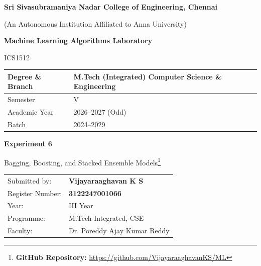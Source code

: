 \documentclass[11pt,a4paper]{article}
\title{}
\date{}
\begin{document}
\begin{titlepage}
\centering
\vspace*{1cm}
{\Large\bfseries Sri Sivasubramaniya Nadar College of Engineering, Chennai\par}
\vspace{0.2cm}
{\normalsize (An Autonomous Institution Affiliated to Anna University)\par}
\vspace{1.2cm}

{\Large\bfseries Machine Learning Algorithms Laboratory\par}
\vspace{0.3cm}
{\large ICS1512\par}
\vspace{1.5cm}

\begin{tabular}{|p{5.5cm}|p{7cm}|}
\hline
Degree \& Branch & M.Tech (Integrated) Computer Science \& Engineering \\
\hline
Semester & V \\
\hline
Academic Year & 2026--2027 (Odd) \\
\hline
Batch & 2024--2029 \\
\hline
\end{tabular}

\vspace{1.8cm}
{\Large\bfseries Experiment 6\par}
\vspace{0.3cm}
{\large Bagging, Boosting, and Stacked Ensemble Models\footnote{\textbf{GitHub Repository: }\url{https://github.com/VijayaraaghavanKS/ML}}\par}
\vspace{2.5cm}

\begin{tabular}{ll}
Submitted by: & \textbf{Vijayaraaghavan K S} \\[4pt]
Register Number: & \textbf{3122247001066} \\[4pt]
Year: & III Year \\[4pt]
Programme: & M.Tech Integrated, CSE \\[4pt]
Faculty: & Dr. Poreddy Ajay Kumar Reddy \\[4pt]
\end{tabular}

\vfill
\end{titlepage}

\tableofcontents
\newpage

\end{document}
